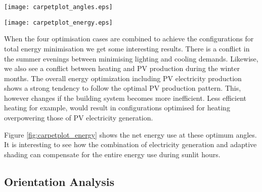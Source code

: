 	\begin{figure*}
	\begin{center}
	\texttt{[image: carpetplot\_angles.eps]}
	\caption{Carpet plots detailing the optimal configuration to minimise the (a) heating demand, (b) cooling demand, (c) lighting demand, and (d) maximise irradiance on PV panels. Each configuration is represented by an angle of orientation around the x-axis (Altitude) and y-axis (Azimuth) as seen in the legend. Figure (e) details the combinations for optimum building thermal management without PV production. (f) also includes the PV production}
	\label{fig:carpetplot}
	\end{center}
	\end{figure*}

	\begin{figure*}
	\begin{center}
	\texttt{[image: carpetplot\_energy.eps]}
	\caption{Carpet plots detailing the net energy consumption. Each square represents the total energy consumption for that specific hour of the entire month. Red colours detail the energy demand, while blue colours detail the energy supply.}
	\label{fig:carpetplot_energy}
	\end{center}
	\end{figure*}



	When the four optimisation cases are combined to achieve the configurations for total energy minimisation we get some interesting results. There is a conflict in the summer evenings between minimising lighting and cooling demands. Likewise, we also see a conflict between heating and PV production during the winter months. The overall energy optimization including PV electricity production shows a strong tendency to follow the optimal PV production pattern. This, however changes if the building system becomes more inefficient. Less efficient heating for example, would result in configurations optimised for heating overpowering those of PV electricity generation.


	Figure \ref{fig:carpetplot_energy} shows the net energy use at these optimum angles. It is interesting to see how the combination of electricity generation and adaptive shading can compensate for the entire energy use during sunlit hours.

	\subsection{Orientation Analysis}

